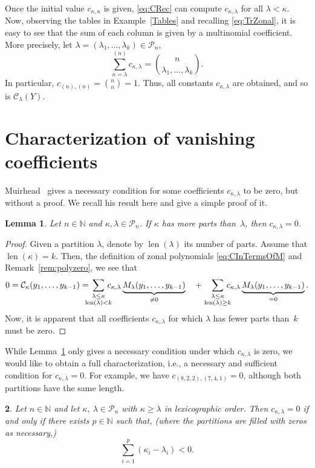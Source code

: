 \documentclass{mathincs}
\numberwithin{equation}{section}
\numberwithin{figure}{section}
\theoremstyle{plain}
\newtheorem{thm}{\protect\theoremname}[section]
\theoremstyle{definition}
\theoremstyle{remark}
\theoremstyle{plain}
\theoremstyle{definition}
\theoremstyle{plain}
\newtheorem{lemma}[thm]{Lemma}
\theoremstyle{plain}
\providecommand{\theoremname}{Theorem}
\begin{document}
Once the initial value $c_{\kappa,\kappa}$ is given,
\eqref{eq:CRec} can compute $c_{\kappa,\lambda}$ for all $\lambda<\kappa$.
Now, observing the tables in Example~\ref{Tables} and recalling \eqref{eq:TrZonal},
it is easy to see that the sum of each column is given by a multinomial
coefficient. More precisely, let
$\lambda=(\lambda_1,\ldots,\lambda_k)\in\mathcal{P}_{n}$,
\begin{equation}
  \sum_{\kappa=\lambda}^{(n)}c_{\kappa,\lambda} =
  \binom{n}{\lambda_1,\ldots,\lambda_k}.\label{eq:CInitial}
\end{equation}
In particular, $c_{(n),(n)}=\binom{n}{n}=1$.
Thus, all constants $c_{\kappa,\lambda}$ are obtained, and so is $\mathcal{C}_{\lambda}(Y)$. 


\section{Characterization of vanishing coefficients}\label{sec:zeros}

Muirhead~\cite[Lem.~7.2.3]{Muirhead} gives a necessary condition for some
coefficients $c_{\kappa,\lambda}$ to be zero, but without a proof. We recall his
result here and give a simple proof of it.
\begin{lemma}\label{lem:zero1}
  Let $n\in\mathbb{N}$ and $\kappa,\lambda\in\mathcal{P}_n$. If $\kappa$
  has more parts than~$\lambda$, then $c_{\kappa,\lambda}=0$.
\end{lemma}
\begin{proof}
  Given a partition $\lambda$, denote by $\operatorname{len}(\lambda)$ its
  number of parts. Assume that $\operatorname{len}(\kappa)=k$. Then, the
  definition of zonal polynomials \eqref{eq:CInTermsOfM} and
  Remark~\ref{rem:polyzero}, we see that
 \[ 
 0 = \mathcal{C}_{\kappa}(y_1,\dots,y_{k-1})= 
  \!\!\!\!\!\sum_{\textstyle\genfrac{}{}{0pt}{}{\lambda\leq\kappa}{\operatorname{len}(\lambda)<k}}\!\!\!\!\!
      c_{\kappa,\lambda} \underbrace{M_{\lambda}(y_1,\dots,y_{k-1})}_{\neq0} \quad +
   \sum_{\textstyle\genfrac{}{}{0pt}{}{\lambda\leq\kappa}{\operatorname{len}(\lambda)\geq k}}\!\!\!\!\!
    c_{\kappa,\lambda} \underbrace{M_{\lambda}(y_1,\dots,y_{k-1})}_{=0}.
 \] 
  Now, it is apparent that all coefficients $c_{\kappa,\lambda}$
  for which $\lambda$ has fewer parts than~$k$ must be zero.
\end{proof}

While Lemma~\ref{lem:zero1} only gives a necessary condition under which
$c_{\kappa,\lambda}$ is zero, we would like to obtain a full characterization,
i.e., a necessary and sufficient condition for $c_{\kappa,\lambda}=0$. For
example, we have $c_{(8,2,2),(7,4,1)} = 0$, although both partitions have the
same length.
\begin{thm}\label{thm:zero2}
  Let $n\in\mathbb{N}$ and let $\kappa,\ \lambda\in\mathcal{P}_n$  with $\kappa\geq\lambda$ in lexicographic order. Then $c_{\kappa,\lambda}=0$
  if and only if there exists $p\in\mathbb{N}$ such that,  (where the partitions are filled with zeros as necessary,)
  \begin{equation}\label{eq:prop}
    \sum_{i=1}^p (\kappa_i - \lambda_i) < 0.
  \end{equation}
\end{thm}
\end{document}
